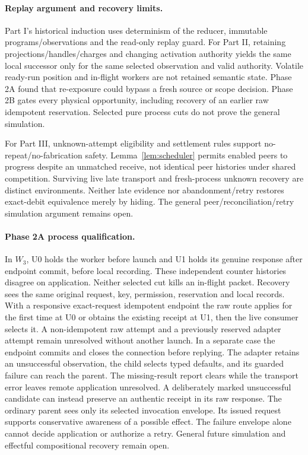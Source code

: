 \documentclass[11pt,a4paper]{article}
\theoremstyle{definition}
\theoremstyle{remark}
\begin{document}
\paragraph{Replay argument and recovery limits.} Part I's historical induction uses determinism of the reducer, immutable programs/observations and the read-only replay guard. For Part II, retaining projections/handles/charges and changing activation authority yields the same local successor only for the same selected observation and valid authority. Volatile ready-run position and in-flight workers are not retained semantic state. Phase 2A found that re-exposure could bypass a fresh source or scope decision. Phase 2B gates every physical opportunity, including recovery of an earlier raw idempotent reservation. Selected pure process cuts do not prove the general simulation.

For Part III, unknown-attempt eligibility and settlement rules support no-repeat/no-fabrication safety. Lemma~\ref{lem:scheduler} permits enabled peers to progress despite an unmatched receive, not identical peer histories under shared competition. Surviving live late transport and fresh-process unknown recovery are distinct environments. Neither late evidence nor abandonment/retry restores exact-debit equivalence merely by hiding. The general peer/reconciliation/retry simulation argument remains open.

\paragraph{Phase 2A process qualification.}
In $W_3$, U0 holds the worker before launch and U1 holds its genuine response after endpoint commit, before local recording. These independent counter histories disagree on application. Neither selected cut kills an in-flight packet. Recovery sees the same original request, key, permission, reservation and local records. With a responsive exact-request idempotent endpoint the raw route applies for the first time at U0 or obtains the existing receipt at U1, then the live consumer selects it. A non-idempotent raw attempt and a previously reserved adapter attempt remain unresolved without another launch. In a separate case the endpoint commits and closes the connection before replying. The adapter retains an unsuccessful observation, the child selects typed defaults, and its guarded failure can reach the parent. The missing-result report clears while the transport error leaves remote application unresolved. A deliberately marked unsuccessful candidate can instead preserve an authentic receipt in its raw response. The ordinary parent sees only its selected invocation envelope. Its issued request supports conservative awareness of a possible effect. The failure envelope alone cannot decide application or authorize a retry. General future simulation and effectful compositional recovery remain open.
\end{document}
